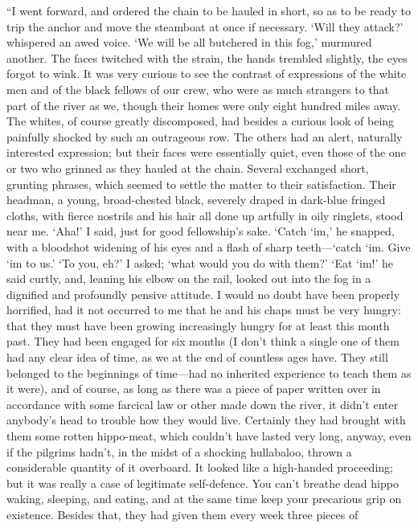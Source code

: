 \documentclass[12pt]{report}
\begin{document}
``I went forward, and ordered the chain to be hauled in short, so as to
be ready to trip the anchor and move the steamboat at once if necessary.
`Will they attack?' whispered an awed voice. `We will be all butchered
in this fog,' murmured another. The faces twitched with the strain, the
hands trembled slightly, the eyes forgot to wink. It was very curious to
see the contrast of expressions of the white men and of the black
fellows of our crew, who were as much strangers to that part of the
river as we, though their homes were only eight hundred miles away. The
whites, of course greatly discomposed, had besides a curious look of
being painfully shocked by such an outrageous row. The others had an
alert, naturally interested expression; but their faces were essentially
quiet, even those of the one or two who grinned as they hauled at the
chain. Several exchanged short, grunting phrases, which seemed to settle
the matter to their satisfaction. Their headman, a young, broad-chested
black, severely draped in dark-blue fringed cloths, with fierce nostrils
and his hair all done up artfully in oily ringlets, stood near me.
`Aha!' I said, just for good fellowship's sake. `Catch `im,' he snapped,
with a bloodshot widening of his eyes and a flash of sharp
teeth---`catch `im. Give `im to us.' `To you, eh?' I asked; `what would
you do with them?' `Eat `im!' he said curtly, and, leaning his elbow on
the rail, looked out into the fog in a dignified and profoundly pensive
attitude. I would no doubt have been properly horrified, had it not
occurred to me that he and his chaps must be very hungry: that they must
have been growing increasingly hungry for at least this month past. They
had been engaged for six months (I don't think a single one of them had
any clear idea of time, as we at the end of countless ages have. They
still belonged to the beginnings of time---had no inherited experience
to teach them as it were), and of course, as long as there was a piece
of paper written over in accordance with some farcical law or other made
down the river, it didn't enter anybody's head to trouble how they would
live. Certainly they had brought with them some rotten hippo-meat, which
couldn't have lasted very long, anyway, even if the pilgrims hadn't, in
the midst of a shocking hullabaloo, thrown a considerable quantity of it
overboard. It looked like a high-handed proceeding; but it was really a
case of legitimate self-defence. You can't breathe dead hippo waking,
sleeping, and eating, and at the same time keep your precarious grip on
existence. Besides that, they had given them every week three pieces of
\end{document}
